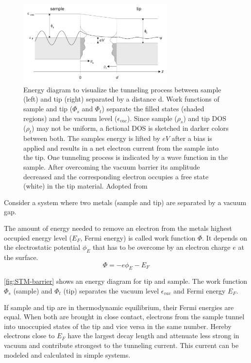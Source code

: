 \begin{figure}[]\centering
	\includegraphics[width=0.7\textwidth]{./images/tunnel-barrier}
	\caption{Energy diagram to visualize the tunneling process between sample (left) and tip (right) separated by a distance d. Work functions of sample and tip ($\Phi_s$ and $\Phi_t$) separate the filled states (shaded regions) and the vacuum level ($\epsilon_{vac}$). Since sample ($\rho_s$) and tip DOS ($\rho_t$) may not be uniform, a fictional DOS is sketched in darker colors between both. The samples energy is lifted by $eV$ after a bias is applied and results in a net electron current from the sample into the tip. One tunneling process is indicated by a wave function in the sample. After overcoming the vacuum barrier its amplitude decreased and the corresponding electron occupies a free state (white) in the tip material.  Adopted from \cite{diss-schunack}}
	\label{fig:STM-barrier}
\end{figure}

Consider a system where two metals (sample and tip) are separated by a vacuum gap. 

The amount of energy needed to remove an electron from the metals highest occupied energy level ($E_F$, Fermi energy) is called work function $\Phi$. It depends on the electrostatic potential $\phi_E$ that has to be overcome by an electron charge $e$ at the surface.
$$ \Phi = -e \phi_E - E_F $$

\autoref{fig:STM-barrier} shows an energy diagram for tip and sample. The work function $\Phi_s$ (sample) and $\Phi_t$ (tip) separates the vacuum level $\epsilon_{vac}$ and Fermi energy $E_F$.

If sample and tip are in thermodynamic equilibrium, their Fermi energies are equal.
When both are brought in close contact, electrons from the sample tunnel into unoccupied states of the tip and vice versa in the same number. Hereby electrons close to $E_F$ have the largest decay length and attenuate less strong in vacuum and contribute strongest to the tunneling current. This current can be modeled and calculated in simple systems. 

